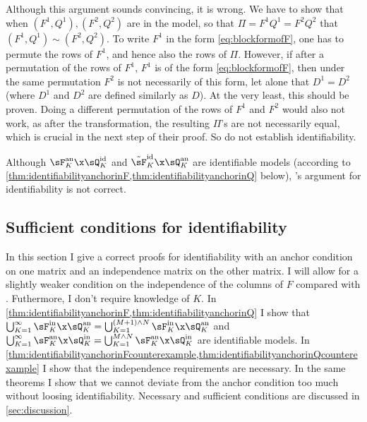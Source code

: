\documentclass[12pt,a4paper]{article}
\begin{document}
Although this argument sounds convincing, it is wrong. We have to show that when $(F^1,Q^1),(F^2,Q^2)$ are in the model, so that $\Pi=F^1Q^1=F^2Q^2$ that $(F^1,Q^1)\sim (F^2,Q^2)$. To write $F^1$ in the form \cref{eq:blockformofF}, one has to permute the rows of $F^1$, and hence also the rows of $\Pi$. However, if after a permutation of the rows of $F^1$, $F^1$ is of the form \cref{eq:blockformofF}, then under the same permutation $F^2$ is not necessarily of this form, let alone that $D^1=D^2$ (where $D^1$ and $D^2$ are defined similarly as $D$). 
 At the very least, this should be proven. 
 Doing a different permutation of the rows of $F^1$ and $F^2$ would also not work, as after the transformation, the resulting $\Pi$'s are not necessarily equal, which is crucial in the next step of their proof. So \cite{CabrerosStorey2019} do not establish identifiability. %

Although $\sF_K^{\text{an}}\x \sQ_K^{\text{id}}$ and $\tilde \sF_K^{\text{id}}\x \sQ_K^{\text{an}}$ are identifiable models (according to \cref{thm:identifiabilityanchorinF,thm:identifiabilityanchorinQ} below), \citeauthor{CabrerosStorey2019}'s argument for identifiability is not correct. 
    
    \subsection{Sufficient conditions for identifiability}
    
    In this section I give a correct proofs for identifiability with an anchor condition on one matrix and an independence matrix on the other matrix. I will allow for a slightly weaker condition on the independence of the columns of $F$ compared with \cite{CabrerosStorey2019}. Futhermore, I don't require knowledge of $K$.  In \cref{thm:identifiabilityanchorinF,thm:identifiabilityanchorinQ} I show that $\bigcup_{K=1}^{\infty }\sF_K^{\text{in}}\x \sQ_K^{\text{an}} = \bigcup_{K=1}^{(M+1)\wedge N}\sF_K^{\text{in}}\x \sQ_K^{\text{an}}$ and $\bigcup_{K=1}^{\infty}\sF_K^{\text{an}}\x \sQ_K^{\text{in}}=\bigcup_{K=1}^{M\wedge N}\sF_K^{\text{an}}\x \sQ_K^{\text{in}}$ are identifiable models. In \cref{thm:identifiabilityanchorinFcounterexample,thm:identifiabilityanchorinQcounterexample} I show that the independence requirements are necessary. In the same theorems I show that we cannot deviate from the anchor condition too much without loosing identifiability. Necessary and sufficient conditions are discussed in \cref{sec:discussion}.
\end{document}
